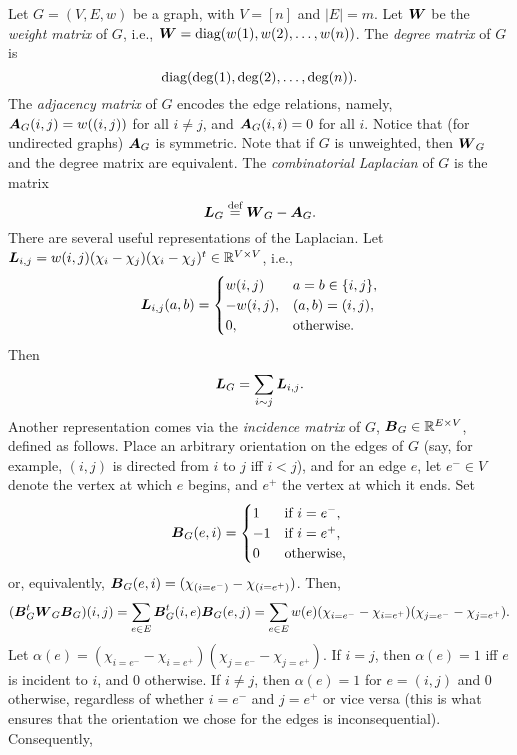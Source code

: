 Let $G=(V,E,w)$ be a graph, with $V=[n]$ and $|E|=m$. 
Let $\vb*{W}$ be the \emph{weight matrix} of $G$, i.e., $\vb*{W}=\text{diag}(w(1),w(2),\dots,w(n))$. 
The \emph{degree matrix} of $G$ is \[\text{diag}(\deg(1),\deg(2),\dots,\deg(n)).\] The \emph{adjacency matrix} of $G$ encodes the edge relations, namely, $\vb*{A}_G(i,j)=w((i,j))$ for all $i\neq j$, and $\vb*{A}_G(i,i)=0$ for all $i$. Notice that (for undirected graphs) $\vb*{A}_G$ is symmetric.  Note that if $G$ is unweighted, then $\vb*{W}_G$ and the degree matrix are equivalent. 
The \emph{combinatorial Laplacian} of $G$ is the matrix 
\begin{equation}
\label{eq:L_G}
\vb*{L}_G\overset{\text{def}}{=} \vb*{W}_G-\vb*{A}_G.
\end{equation}
There are several useful representations of the Laplacian. Let $\vb*{L}_{i,j}=w(i,j)(\chi_i-\chi_j) (\chi_i-\chi_j)^t\in \mathbb{R}^{V\times V}$, i.e., 
\[\vb*{L}_{i,j}(a,b)=\begin{cases}
w(i,j)&a=b\in\{i,j\},\\
-w(i,j),&(a,b)=(i,j),\\
0,&\text{otherwise}.
\end{cases}\]
Then 
\begin{equation}
\label{eq:Lsum}
    \vb*{L}_G=\sum_{i\sim j}\vb*{L}_{i,j}.
\end{equation}
Another representation comes via the \emph{incidence matrix} of $G$, $\vb*{B}_G\in \mathbb{R}^{E\times V}$, defined as follows. Place an arbitrary orientation on the edges of $G$ (say, for example, $(i,j)$ is directed from $i$ to $j$ iff $i<j$), and for an edge $e$, let $e^-\in V$ denote the vertex at which $e$ begins, and $e^+$ the vertex at which it ends. Set 
\begin{equation}
\label{eq:B_G}
\vb*{B}_G(e,i)=\begin{cases}
1&\text{if }i=e^-,\\
-1&\text{if }i=e^+,\\
0&\text{otherwise},
\end{cases}
\end{equation}
or, equivalently, $\vb*{B}_G(e,i) = (\chi_{(i=e^-)}-\chi_{(i=e^+)})$. Then,
\begin{equation*}
   ( \vb*{B}_G^t\vb*{W}_G\vb*{B}_G)(i,j)=\sum_{e\in E} \vb*{B}_G^t(i,e)\vb*{B}_G(e,j)=\sum_{e\in E}w(e)(\chi_{i=e^-}-\chi_{i=e^+})(\chi_{j=e^-}-\chi_{j=e^+}).
\end{equation*}
Let $\alpha(e)=(\chi_{i=e^-}-\chi_{i=e^+})(\chi_{j=e^-}-\chi_{j=e^+})$. If $i=j$, then $\alpha(e)=1$ iff $e$ is incident to $i$, and 0 otherwise. If $i\neq j$, then $\alpha(e)=1$ for $e=(i,j)$ and 0 otherwise, regardless of whether $i=e^-$ and $j=e^+$ or vice versa (this is what ensures that the orientation we chose for the edges is inconsequential). Consequently, 
